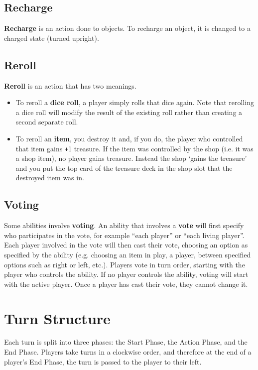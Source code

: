 \documentclass[
  fontsize=10pt,
  paper=a5,
  version=last,
  chapterprefix=true,
  bindingoffset=5mm,
  ]{scrbook}
\def\plus{\texttt{+}}
\begin{document}
    \section{Recharge}
    \textbf{Recharge} is an action done to objects. To recharge an object, it is changed to a charged state (turned upright).
    \section{Reroll}
    \textbf{Reroll} is an action that has two meanings.

    \begin{itemize}
        \item To reroll a \textbf{dice roll}, a player simply rolls that dice again. Note that rerolling a dice roll will modify the result of the existing roll rather than creating a second separate roll.
        \item To reroll an \textbf{item}, you destroy it and, if you do, the player who controlled that item gains \plus1 treasure. If the item was controlled by the shop (i.e. it was a shop item), no player gains treasure. Instead the shop ‘gains the treasure’ and you put the top card of the treasure deck in the shop slot that the destroyed item was in.
    \end{itemize}
    \section{Voting}
    Some abilities involve \textbf{voting}. An ability that involves a \textbf{vote} will first specify who participates in the vote, for example “each player” or “each living player”. Each player involved in the vote will then cast their vote, choosing an option as specified by the ability (e.g. choosing an item in play, a player, between specified options such as right or left, etc.). Players vote in turn order, starting with the player who controls the ability. If no player controls the ability, voting will start with the active player. Once a player has cast their vote, they cannot change it.

    \chapter{Turn Structure}
    \label{turn}
    Each turn is split into three phases: the Start Phase, the Action Phase, and the End Phase. Players take turns in a clockwise order, and therefore at the end of a player’s End Phase, the turn is passed to the player to their left.
\end{document}
